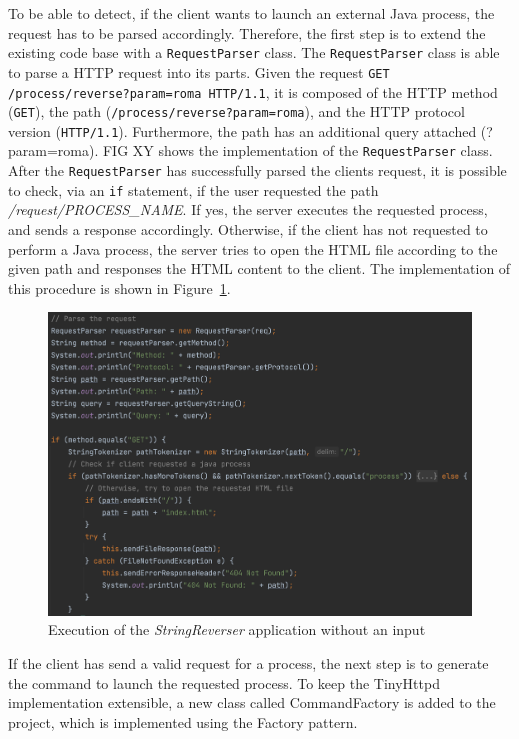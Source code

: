 \documentclass{article}
\def\Fig#1{Figure~\ref{#1}}
\begin{document}
To be able to detect, if the client wants to launch an external Java process, the request has to be parsed accordingly. Therefore, the first step is to extend the existing code base with a \texttt{RequestParser} class. The \texttt{RequestParser} class is able to parse a HTTP request into its parts. Given the request \texttt{GET /process/reverse?param=roma HTTP/1.1}, it is composed of the HTTP method (\texttt{GET}), the path (\texttt{/process/reverse?param=roma}), and the HTTP protocol version (\texttt{HTTP/1.1}). Furthermore, the path has an additional query attached (?param=roma). FIG XY shows the implementation of the \texttt{RequestParser} class.
After the \texttt{RequestParser} has successfully parsed the clients request, it is possible to check, via an \texttt{if} statement, if the user requested the path \textit{/request/PROCESS\_NAME}. If yes, the server executes the requested process, and sends a response accordingly. Otherwise, if the client has not requested to perform a Java process, the server tries to open the HTML file according to the given path and responses the HTML content to the client. The implementation of this procedure is shown in \Fig{fig:01_part1_impl_tinyhttpd_parsing}.
\begin{figure}[h]
\centering
\includegraphics[scale=0.4]{images/TinyHttpdParsing}
\caption{Execution of the \textit{StringReverser} application without an input}
\label{fig:01_part1_impl_tinyhttpd_parsing}
\end{figure}

If the client has send a valid request for a process, the next step is to generate the command to launch the requested process. To keep the TinyHttpd implementation extensible, a new class called CommandFactory is added to the project, which is implemented using the Factory pattern.
\end{document}
